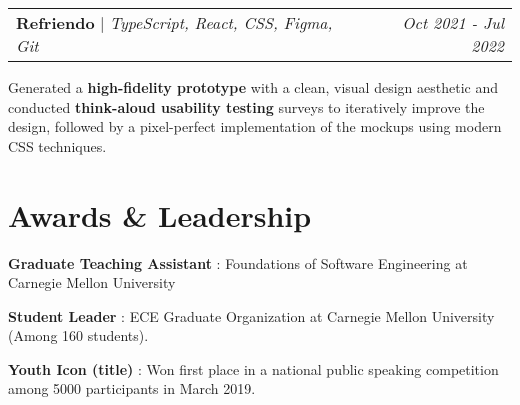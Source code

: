 \documentclass[letterpaper]{article}
\makeatletter
\newcommand{\shortSection}[1]{
    \vspace{-6pt}
    \section{#1}
}
\newcommand{\projectHeading}[3]{
  \begin{tabular*}{\textwidth}{l@{\extracolsep{\fill}}r}
        \textbf{#1} 
        \hspace{-2pt} $\vert$ \hspace{-2pt} \small{\textit{#2}} 
        & 
        \textit{#3} \\
    \end{tabular*}\vspace{0pt}
}
\newcommand*{\skill}[2]{
  \textbf{#1} : #2 \\
  \vspace{1pt}
}
\makeatother
\begin{document}
\vspace{6pt}
\projectHeading {Refriendo}{TypeScript, React, CSS, Figma, Git}{Oct 2021 - Jul 2022}
Generated a \textbf{high-fidelity prototype} with a clean, visual design aesthetic and conducted \textbf{think-aloud usability testing} surveys to iteratively improve the design, followed by a pixel-perfect implementation of the mockups using modern CSS techniques.

\shortSection{Awards \& Leadership}
\skill {Graduate Teaching Assistant}{Foundations of Software Engineering at Carnegie Mellon University}
\skill {Student Leader}{ ECE Graduate Organization at Carnegie Mellon University (Among 160 students).}
\skill {Youth Icon (title)}{Won first place in a national public speaking competition among 5000 participants in March 2019.}
\end{document}
